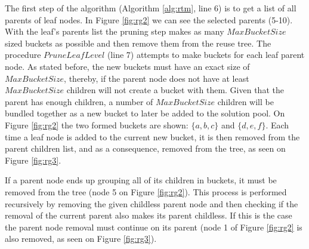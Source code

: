 

The first step of the algorithm (Algorithm \ref{alg:rtm}, line 6) is to get a list of all parents of leaf nodes. In Figure \ref{fig:rg2} we can see the selected parents (5-10). With the leaf's parents list the pruning step makes as many $MaxBucketSize$ sized buckets as possible and then remove them from the reuse tree. The procedure $PruneLeafLevel$ (line 7) attempts to make buckets for each leaf parent node. As stated before, the new buckets must have an exact size of $MaxBucketSize$, thereby, if the parent node does not have at least $MaxBucketSize$ children will not create a bucket with them. Given that the parent has enough children, a number of $MaxBucketSize$ children will be bundled together as a new bucket to later be added to the solution pool. On Figure \ref{fig:rg2} the two formed buckets are shown: $\{a,b,c\}$ and $\{d,e,f\}$. Each time a leaf node is added to the current new bucket, it is then removed from the parent children list, and as a consequence, removed from the tree, as seen on Figure \ref{fig:rg3}.

If a parent node ends up grouping all of its children in buckets, it must be removed from the tree (node 5 on Figure \ref{fig:rg2}). This process is performed recursively by removing the given childless parent node and then checking if the removal of the current parent also makes its parent childless. If this is the case the parent node removal must continue on its parent (node 1 of Figure \ref{fig:rg2} is also removed, as seen on Figure \ref{fig:rg3}).

